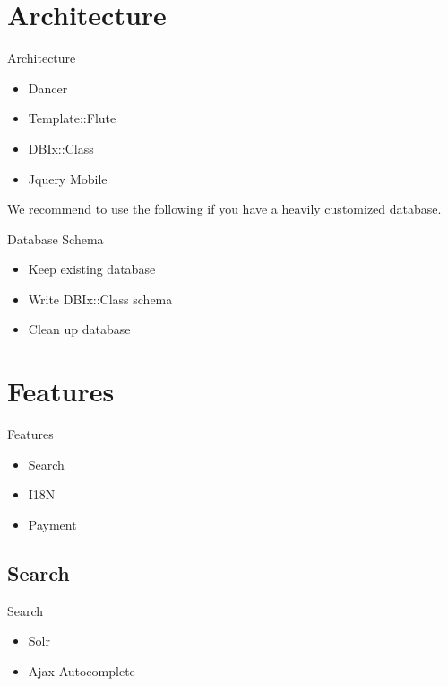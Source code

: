 \section{Architecture}
\begin{frame}{Architecture}
\begin{itemize}
\item Dancer
\item Template::Flute
\item DBIx::Class
\item Jquery Mobile
\end{itemize}
\end{frame}

We recommend to use the following if you have a heavily customized
database.

\begin{frame}{Database Schema}
\begin{itemize}
\item Keep existing database
\item Write DBIx::Class schema
\item Clean up database
\end{itemize}
\end{frame}

\section{Features}


\begin{frame}{Features}
\begin{itemize}
\item Search
\item I18N
\item Payment
\end{itemize}
\end{frame}

\subsection{Search}
\begin{frame}{Search}
\begin{itemize}
\item Solr
\item Ajax Autocomplete
\end{itemize}
\end{frame}

